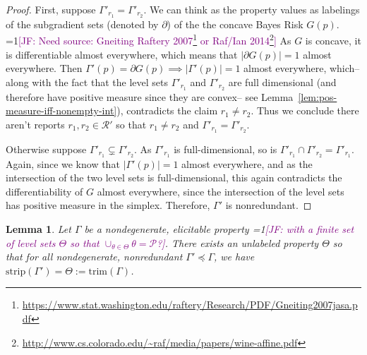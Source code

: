 \documentclass[12pt]{article}
\newcommand{\Comments}{1}
\newcommand{\mynote}[2]{\ifnum\Comments=1\textcolor{#1}{#2}\fi}
\newcommand{\jessie}[1]{\mynote{purple}{[JF: #1]}}
\renewcommand{\P}{\mathcal{P}}
\newcommand{\R}{\mathcal{R}}
\newcommand{\strip}{\mathrm{strip}}
\newtheorem{lemma}{Lemma}
\begin{document}
\begin{proof}
	First, suppose $\Gamma'_{r_1} = \Gamma'_{r_2}$.
	We can think as the property values as labelings of the subgradient sets (denoted by $\partial$) of the the concave Bayes Risk $G(p)$.
	\jessie{Need source: Gneiting Raftery 2007\footnote{\url{https://www.stat.washington.edu/raftery/Research/PDF/Gneiting2007jasa.pdf}} or Raf/Ian 2014\footnote{\url{http://www.cs.colorado.edu/~raf/media/papers/wine-affine.pdf}}}
	As $G$ is concave, it is differentiable almost everywhere, which means that $|\partial G(p)| = 1$ almost everywhere.
	Then $\Gamma'(p) = \partial G(p) \implies |\Gamma'(p)| = 1$ almost everywhere, which-- along with the fact that the level sets $\Gamma'_{r_1}$ and $\Gamma'_{r_2}$ are full dimensional (and therefore have positive measure since they are convex-- see Lemma~\ref{lem:pos-measure-iff-nonempty-int}), contradicts the claim $r_1 \neq r_2$.
	Thus we conclude there aren't reports $r_1, r_2 \in \R'$ so that $r_1 \neq r_2$ and $\Gamma'_{r_1} = \Gamma'_{r_2}$.
	
	
	Otherwise suppose $\Gamma'_{r_1} \subsetneq \Gamma'_{r_2}$.
	As $\Gamma'_{r_1}$ is full-dimensional, so is $\Gamma'_{r_1} \cap \Gamma'_{r_2} = \Gamma'_{r_1}$.
	Again, since we know that $|\Gamma'(p)| = 1$ almost everywhere, and as the intersection of the two level sets is full-dimensional, this again contradicts the differentiability of $G$ almost everywhere, since the intersection of the level sets has positive measure in the simplex.
	Therefore, $\Gamma'$ is nonredundant.

\end{proof}


\begin{lemma}\label{lem:define-trim}
	Let $\Gamma$  be a nondegenerate, elicitable property \jessie{with a finite set of level sets $\Theta$ so that $\cup_{\theta \in \Theta} \theta = \P$?}.
	There exists an unlabeled property $\Theta$ so that for all nondegenerate, nonredundant $\Gamma' \preceq \Gamma$, we have $\strip(\Gamma') = \Theta := \text{trim}(\Gamma)$.
\end{lemma}
\end{document}
